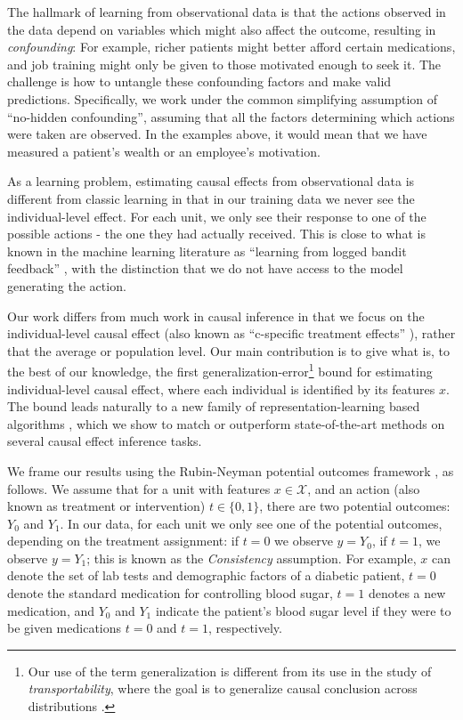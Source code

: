 \documentclass{article}
\def\cX{\mathcal X}
\begin{document}
The hallmark of learning from observational data is that the actions observed in the data depend on variables which might also affect the outcome, resulting in \emph{confounding}: For example, richer patients might better afford certain medications, and job training might only be given to those motivated enough to seek it. The challenge is how to untangle these confounding factors and make valid predictions. Specifically, we work under the common simplifying assumption of ``no-hidden confounding'', assuming that all the factors determining which actions were taken are observed. In the examples above, it would mean that we have measured a patient's wealth or an employee's motivation.

As a learning problem, estimating causal effects from observational data is different from classic learning in that in our training data we never see the individual-level effect. For each unit, we only see their response to one of the possible actions - the one they had actually received. This is close to what is known in the machine learning literature as ``learning from logged bandit feedback'' \citep{strehl2010learning,swaminathan2015batch}, with the distinction that we do not have access to the model generating the action.


Our work differs from much work in causal inference in that we focus on the individual-level causal effect (also known as ``c-specific treatment effects'' \citet{shpitser2006ident,pearl2015detecting}), rather that the average or population level. Our main contribution is to give what is, to the best of our knowledge, the first generalization-error\footnote{Our use of the term generalization is different from its use in the study of \emph{transportability}, where the goal is to generalize causal conclusion across distributions \citep{bareinboim2016causal}.} bound for estimating individual-level causal effect, where each individual is identified by its features $x$. The bound leads naturally to a new family of representation-learning based algorithms \cite{bengio2013representation}, which we show to match or outperform state-of-the-art methods on several causal effect inference tasks.


We frame our results using the Rubin-Neyman potential outcomes framework \cite{rubin2011causal}, as follows. We assume that for a unit with features $x \in \cX$, and an action (also known as treatment or intervention) $t \in \{0,1\}$, there are two potential outcomes: $Y_0$ and $Y_1$. In our data, for each unit we only see one of the potential outcomes, depending on the treatment assignment: if $t=0$ we observe $y=Y_0$, if $t=1$, we observe $y=Y_1$; this is known as the \emph{Consistency} assumption. For example, $x$ can denote the set of lab tests and demographic factors of a diabetic patient, $t=0$ denote the standard medication for controlling blood sugar, $t=1$ denotes a new medication, and $Y_0$ and $Y_1$ indicate the patient's blood sugar level if they were to be given medications $t=0$ and $t=1$, respectively.
\end{document}
